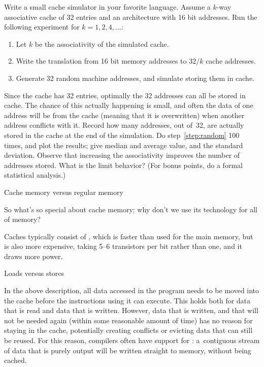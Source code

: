 \begin{exercise}
  Write a small cache simulator in your favorite language. Assume a
  $k$-way associative cache of 32 entries and an architecture with 16
  bit addresses. Run the following
  experiment for $k=1,2,4,\ldots$:
  \begin{enumerate}
  \item Let $k$ be the associativity of the simulated cache.
  \item Write the translation from 16 bit memory addresses to $32/k$ 
    cache addresses.
  \item\label{step:random} Generate 32 random machine addresses, and
    simulate storing them in cache.
  \end{enumerate}
  Since the cache has 32 entries, optimally the 32 addresses can all
  be stored in cache. The chance of this actually happening is small,
  and often the data of one address will be  from the cache
  (meaning that it is overwritten) when another address conflicts with
  it. Record how many addresses, out of~32, are actually stored in the
  cache at the end of the simulation. Do step~\ref{step:random} 100
  times, and plot the results; give median and average value, and the
  standard deviation. Observe that increasing the associativity
  improves the number of addresses stored. What is the limit
  behavior? (For bonus points, do a formal statistical analysis.)
\end{exercise}



 {Cache memory versus regular memory}

So what's so special about cache memory; why don't we use its
technology for all of memory?

Caches typically
consist of , which is faster than 
used for the main memory, but is also more expensive, taking 5--6
transistors per bit rather than one, and it draws more power.

 {Loads versus stores}

In the above description, all data accessed in the program needs to be
moved into the cache before the instructions using it can
execute. This holds both for data that is read and data that is
written. However, data that is written, and that will not be needed
again (within some reasonable amount of time) has no reason for
staying in the cache, potentially creating conflicts or evicting data
that can still be reused. For this reason, compilers often have
support for : a~contiguous stream of
data that is purely output will be written straight to memory, without
being cached.

